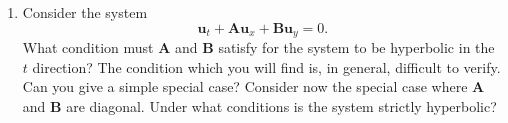\begin{enumerate}[label=\thesection.\arabic*.,ref=\thesection.\arabic*,start=1,series=book-problems]
\item\label{ex:hyperbolicity-two-matrices} Consider the system
\begin{equation}\label{eq:hyperbolic-two-spatial-directions-system}
\bm{u}_t+\bm{A}\bm{u}_x+\bm{B}\bm{u}_y=0.
\end{equation}
What condition must $\bm{A}$ and $\bm{B}$ satisfy for the system to be hyperbolic in the $t$ direction? The condition which you will find is, in general, difficult to verify. Can you give a simple special case? Consider now the special case where $\bm{A}$ and $\bm{B}$ are diagonal. Under what conditions is the system strictly hyperbolic?

\end{enumerate}
